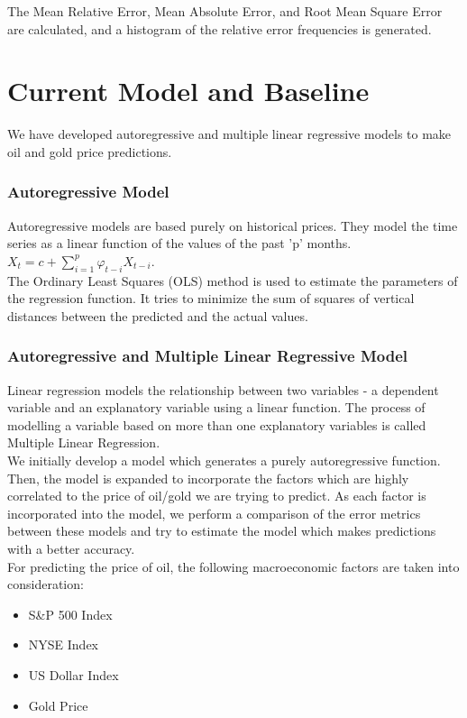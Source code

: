 \documentclass[runningheads]{llncs}
\begin{document}
The Mean Relative Error, Mean Absolute Error, and Root Mean Square Error are calculated, and a histogram of the relative error frequencies is generated. \\

\newpage
\section{Current Model and Baseline}

We have developed autoregressive and multiple linear regressive models to make oil and gold price predictions.

\subsubsection{Autoregressive Model}
Autoregressive models are based purely on historical prices. They model the time series as a linear function of the values of the past 'p' months.\\

$ X_{t} = c + \sum\limits_{i=1}^p \varphi_{t-i}X_{t-i}$. \\

\noindent The Ordinary Least Squares (OLS) method is used to estimate the parameters of the regression function. It tries to minimize the sum of squares of vertical distances between the predicted and the actual values. 

\subsubsection{Autoregressive and Multiple Linear Regressive Model}
Linear regression models the relationship between two variables - a dependent variable and an explanatory variable using a linear function. The process of modelling a variable based on more than one explanatory variables is called Multiple Linear Regression. \\
   
\noindent We initially develop a model which generates a purely autoregressive function. Then, the model is expanded to incorporate the factors which are highly correlated to the price of oil/gold we are trying to predict. As each factor is incorporated into the model, we perform a comparison of the error metrics between these models and try to estimate the model which makes predictions with a better accuracy.\\

For predicting the price of oil, the following macroeconomic factors are taken into consideration:
\begin {itemize}
\item S\&P 500 Index
\item NYSE Index
\item US Dollar Index
\item Gold Price
\end {itemize}
\end{document}
